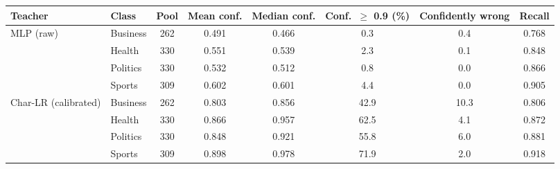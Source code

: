 \begin{tabular}{llcccccc}
\toprule
Teacher & Class & Pool & Mean conf. & Median conf. & Conf.\ $\ge$ 0.9 (\%) & Confidently wrong & Recall \\
\midrule
MLP (raw) & Business & 262 & 0.491 & 0.466 & 0.3 & 0.4 & 0.768 \\
 & Health & 330 & 0.551 & 0.539 & 2.3 & 0.1 & 0.848 \\
 & Politics & 330 & 0.532 & 0.512 & 0.8 & 0.0 & 0.866 \\
 & Sports & 309 & 0.602 & 0.601 & 4.4 & 0.0 & 0.905 \\
\addlinespace
Char-LR (calibrated) & Business & 262 & 0.803 & 0.856 & 42.9 & 10.3 & 0.806 \\
 & Health & 330 & 0.866 & 0.957 & 62.5 & 4.1 & 0.872 \\
 & Politics & 330 & 0.848 & 0.921 & 55.8 & 6.0 & 0.881 \\
 & Sports & 309 & 0.898 & 0.978 & 71.9 & 2.0 & 0.918 \\
\bottomrule
\end{tabular}
